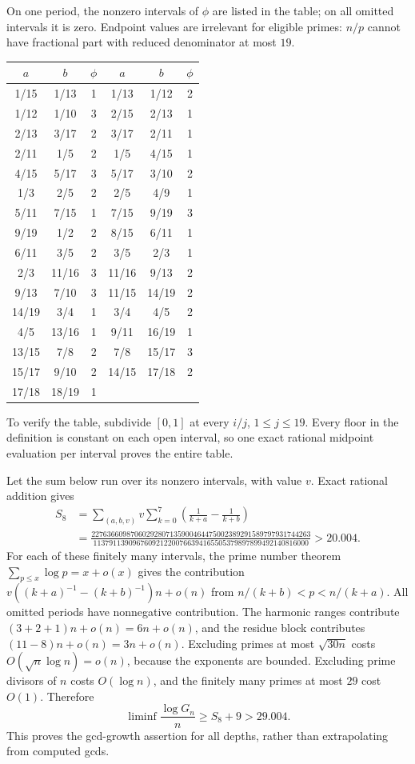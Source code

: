 \documentclass[11pt]{article}
\begin{document}
On one period, the nonzero intervals of $\phi$ are listed in the table;
on all omitted intervals it is zero. Endpoint values are irrelevant
for eligible primes: $n/p$ cannot have fractional part with reduced
denominator at most $19$.
\begin{longtable}{ccc@{\qquad}ccc}
\toprule $a$&$b$&$\phi$&$a$&$b$&$\phi$\\\midrule
1/15&1/13&1&1/13&1/12&2\\
1/12&1/10&3&2/15&2/13&1\\
2/13&3/17&2&3/17&2/11&1\\
2/11&1/5&2&1/5&4/15&1\\
4/15&5/17&3&5/17&3/10&2\\
1/3&2/5&2&2/5&4/9&1\\
5/11&7/15&1&7/15&9/19&3\\
9/19&1/2&2&8/15&6/11&1\\
6/11&3/5&2&3/5&2/3&1\\
2/3&11/16&3&11/16&9/13&2\\
9/13&7/10&3&11/15&14/19&2\\
14/19&3/4&1&3/4&4/5&2\\
4/5&13/16&1&9/11&16/19&1\\
13/15&7/8&2&7/8&15/17&3\\
15/17&9/10&2&14/15&17/18&2\\
17/18&18/19&1&&&\\\bottomrule
\end{longtable}
To verify the table, subdivide $[0,1]$ at every $i/j$, $1\leq j\leq19$.
Every floor in the definition is constant on each open interval, so one
exact rational midpoint evaluation per interval proves the entire table.

Let the sum below run over its nonzero intervals, with value $v$.
Exact rational addition gives
\begin{align*}
 S_8&=\sum_{(a,b,v)}v\sum_{k=0}^7
       \left(\frac1{k+a}-\frac1{k+b}\right)\\
 &=\frac{22763660987060292807135900464475002389291589797931744263}
 {1137911390967609212200766394165505379897899492140816000}
 >20.004.
\end{align*}
For each of these finitely many intervals, the prime number theorem
$\sum_{p\leq x}\log p=x+o(x)$ gives the contribution
$v((k+a)^{-1}-(k+b)^{-1})n+o(n)$ from
$n/(k+b)<p<n/(k+a)$. All omitted periods have nonnegative contribution.
The harmonic ranges contribute $(3+2+1)n+o(n)=6n+o(n)$, and the
residue block contributes $(11-8)n+o(n)=3n+o(n)$.
Excluding primes at most $\sqrt{30n}$ costs $O(\sqrt n\log n)=o(n)$,
because the exponents are bounded. Excluding prime divisors of $n$ costs
$O(\log n)$, and the finitely many primes at most $29$ cost $O(1)$.
Therefore
\[
 \liminf\frac{\log G_n}{n}\geq S_8+9>29.004.
\]
This proves the gcd-growth assertion for all depths, rather than
extrapolating from computed gcds.
\end{document}
